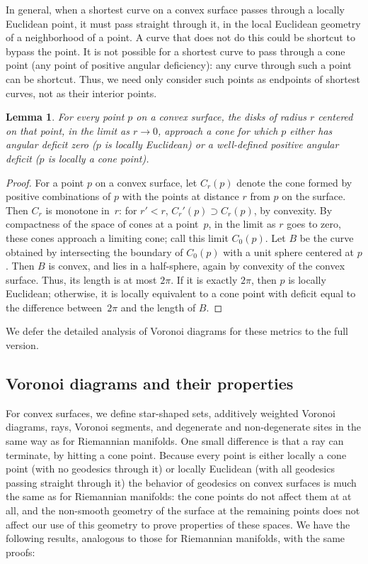 \documentclass[11pt]{article}
\newtheorem{lemma}{Lemma}
\theoremstyle{definition}
\begin{document}
In general, when a shortest curve on a convex surface passes through a locally Euclidean point, it must pass straight through it, in the local Euclidean geometry of a neighborhood of a point. A curve that does not do this could be shortcut to bypass the point. It is not possible for a shortest curve to pass through a cone point (any point of positive angular deficiency): any curve through such a point can be shortcut. Thus, we need only consider such points as endpoints of shortest curves, not as their interior points.

\begin{lemma}
For every point $p$ on a convex surface, the disks of radius $r$ centered on that point, in the limit as $r\to 0$, approach a cone for which $p$ either has angular deficit zero ($p$ is locally Euclidean) or a well-defined positive angular deficit ($p$ is locally a cone point).
\end{lemma}

\begin{proof}
For a point $p$ on a convex surface, let $C_r(p)$ denote the cone formed by positive combinations of $p$ with the points at distance $r$ from $p$ on the surface. Then $C_r$ is monotone in~$r$: for $r'<r$, $C_r'(p)\supset C_r(p)$, by convexity. By compactness of the space of cones at a point~$p$, in the limit as $r$ goes to zero, these cones approach a limiting cone; call this limit $C_0(p)$. Let $B$ be the curve obtained by intersecting the boundary of $C_0(p)$ with a unit sphere centered at $p$. Then $B$ is convex, and lies in a half-sphere, again by convexity of the convex surface. Thus, its length is at most $2\pi$. If it is exactly $2\pi$, then $p$ is locally Euclidean; otherwise, it is locally equivalent to a cone point with deficit equal to the difference between~$2\pi$ and the length of $B$.
\end{proof}

\iffull
\else
We defer the detailed analysis of Voronoi diagrams for these metrics to the full version.
\fi

\iffull
\subsection{Voronoi diagrams and their properties}
\label{sec:convex-vor}
For convex surfaces, we define star-shaped sets, additively weighted Voronoi diagrams, rays, Voronoi segments, and degenerate and non-degenerate sites in the same way as for Riemannian manifolds. One small difference is that a ray can terminate, by hitting a cone point. Because every point is either locally a cone point (with no geodesics through it) or locally Euclidean (with all geodesics passing straight through it) the behavior of geodesics on convex surfaces is much the same as for Riemannian manifolds: the cone points do not affect them at at all, and the non-smooth geometry of the surface at the remaining points does not affect our use of this geometry to prove properties of these spaces. We have the following results, analogous to those for Riemannian manifolds, with the same proofs:
\end{document}
